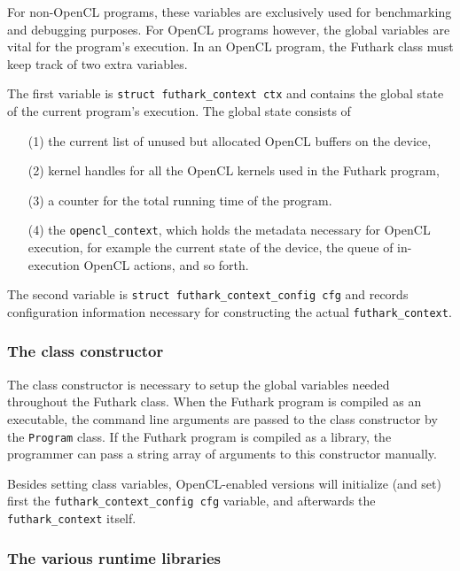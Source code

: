 For non-OpenCL programs, these variables are exclusively used for benchmarking and
debugging purposes. For OpenCL programs however, the global variables are vital
for the program's execution.
In an OpenCL program, the Futhark class must keep track of two extra
variables.

The first variable is \texttt{struct futhark\_context ctx} and contains 
the global state of the current program's execution. The global state consists of 
\begin{itemize}
    \item[(1)] the current list of unused but allocated OpenCL buffers on the device, 
    \item[(2)] kernel handles for all the OpenCL kernels used in the Futhark program,
    \item[(3)] a counter for the total running time of the program.
    \item[(4)] the  \texttt{opencl\_context}, which holds the metadata necessary for
                OpenCL execution, for example the current state of the device, 
                the queue of in-execution OpenCL actions, and so forth.
\end{itemize}

The second variable is \texttt{struct futhark\_context\_config cfg} and records
configuration information necessary for constructing the actual 
\texttt{futhark\_context}.

\subsubsection{The class constructor}
The class constructor is necessary to setup the global variables needed
throughout the Futhark class. When the Futhark program is compiled as an
executable, the command line arguments are passed to the class constructor by
the \texttt{Program} class. If the Futhark program is compiled as a library, the
programmer can pass a string array of arguments to this constructor manually.

Besides setting class variables, OpenCL-enabled versions will initialize (and
set) first the \texttt{futhark\_context\_config cfg} variable, and afterwards
the \texttt{futhark\_context} itself.

\subsubsection{The various runtime libraries}
\label{subsec:runtimelibs}

